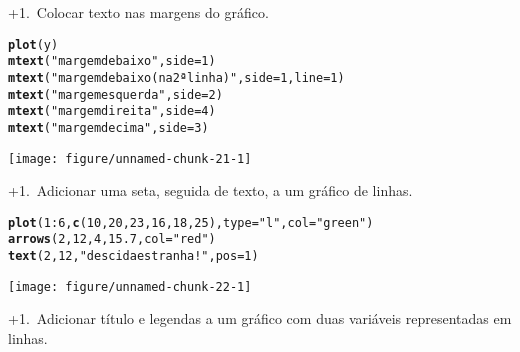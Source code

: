 \documentclass{article}\usepackage[]{graphicx}\usepackage[]{color}
\makeatletter
\def\maxwidth{ %
  \ifdim\Gin@nat@width>\linewidth
    \linewidth
  \else
    \Gin@nat@width
  \fi
}
\newcommand{\hlnum}[1]{\textcolor[rgb]{0.686,0.059,0.569}{#1}}%
\newcommand{\hlstr}[1]{\textcolor[rgb]{0.192,0.494,0.8}{#1}}%
\newcommand{\hlopt}[1]{\textcolor[rgb]{0,0,0}{#1}}%
\newcommand{\hlstd}[1]{\textcolor[rgb]{0.345,0.345,0.345}{#1}}%
\newcommand{\hlkwc}[1]{\textcolor[rgb]{0.333,0.667,0.333}{#1}}%
\newcommand{\hlkwd}[1]{\textcolor[rgb]{0.737,0.353,0.396}{\textbf{#1}}}%
\newenvironment{kframe}{%
 \def\at@end@of@kframe{}%
 \ifinner\ifhmode%
  \def\at@end@of@kframe{\end{minipage}}%
  \begin{minipage}{\columnwidth}%
 \fi\fi%
 \def\FrameCommand##1{\hskip\@totalleftmargin \hskip-\fboxsep
 \colorbox{shadecolor}{##1}\hskip-\fboxsep
     \hskip-\linewidth \hskip-\@totalleftmargin \hskip\columnwidth}%
 \MakeFramed {\advance\hsize-\width
   \@totalleftmargin\z@ \linewidth\hsize
   \@setminipage}}%
 {\par\unskip\endMakeFramed%
 \at@end@of@kframe}
\newenvironment{knitrout}{}{} %
\newcounter{graph}[section]
\renewcommand{\thegraph}{\number\numexpr\value{graph}+1\relax.~\stepcounter{graph}}
\makeatother
\begin{document}
\pagebreak
\thegraph Colocar texto nas margens do gráfico.
\begin{knitrout}
\color{fgcolor}\begin{kframe}
\begin{alltt}
\hlkwd{plot}\hlstd{(y)}
\hlkwd{mtext}\hlstd{(}\hlstr{"margem de baixo"}\hlstd{,} \hlkwc{side} \hlstd{=} \hlnum{1}\hlstd{)}
\hlkwd{mtext}\hlstd{(}\hlstr{"margem de baixo (na 2ª linha)"}\hlstd{,} \hlkwc{side} \hlstd{=} \hlnum{1}\hlstd{,} \hlkwc{line} \hlstd{=} \hlnum{1}\hlstd{)}
\hlkwd{mtext}\hlstd{(}\hlstr{"margem esquerda"}\hlstd{,} \hlkwc{side} \hlstd{=} \hlnum{2}\hlstd{)}
\hlkwd{mtext}\hlstd{(}\hlstr{"margem direita"}\hlstd{,} \hlkwc{side} \hlstd{=} \hlnum{4}\hlstd{)}
\hlkwd{mtext}\hlstd{(}\hlstr{"margem de cima"}\hlstd{,} \hlkwc{side}\hlstd{=}\hlnum{3}\hlstd{)}
\end{alltt}
\end{kframe}
\texttt{[image: figure/unnamed-chunk-21-1]} 

\end{knitrout}
\pagebreak
\thegraph Adicionar uma seta, seguida de texto, a um gráfico de linhas.
\begin{knitrout}
\color{fgcolor}\begin{kframe}
\begin{alltt}
\hlkwd{plot}\hlstd{(}\hlnum{1}\hlopt{:}\hlnum{6}\hlstd{,} \hlkwd{c}\hlstd{(}\hlnum{10}\hlstd{,} \hlnum{20}\hlstd{,} \hlnum{23}\hlstd{,} \hlnum{16}\hlstd{,} \hlnum{18}\hlstd{,} \hlnum{25}\hlstd{),} \hlkwc{type} \hlstd{=} \hlstr{"l"}\hlstd{,} \hlkwc{col} \hlstd{=} \hlstr{"green"}\hlstd{)}
\hlkwd{arrows}\hlstd{(}\hlnum{2}\hlstd{,} \hlnum{12}\hlstd{,} \hlnum{4}\hlstd{,} \hlnum{15.7}\hlstd{,} \hlkwc{col} \hlstd{=} \hlstr{"red"}\hlstd{)}
\hlkwd{text}\hlstd{(}\hlnum{2}\hlstd{,} \hlnum{12}\hlstd{,} \hlstr{"descida estranha!"}\hlstd{,} \hlkwc{pos} \hlstd{=} \hlnum{1}\hlstd{)}
\end{alltt}
\end{kframe}
\texttt{[image: figure/unnamed-chunk-22-1]} 

\end{knitrout}
\pagebreak
\thegraph Adicionar título e legendas a um gráfico com duas variáveis representadas em linhas.
\end{document}
